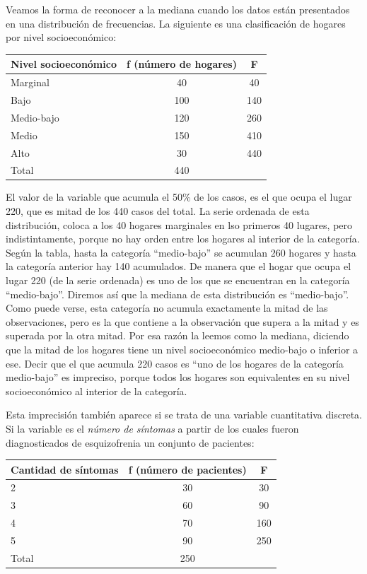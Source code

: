 \documentclass[]{book}
\begin{document}
Veamos la forma de reconocer a la mediana cuando los datos están
presentados en una distribución de frecuencias. La siguiente es una
clasificación de hogares por nivel socioeconómico:

\begin{longtable}[]{@{}lcc@{}}
\toprule
Nivel socioeconómico & f (número de hogares) & F\tabularnewline
\midrule
\endhead
Marginal & 40 & 40\tabularnewline
Bajo & 100 & 140\tabularnewline
Medio-bajo & 120 & 260\tabularnewline
Medio & 150 & 410\tabularnewline
Alto & 30 & 440\tabularnewline
Total & 440 &\tabularnewline
\bottomrule
\end{longtable}

El valor de la variable que acumula el 50\% de los casos, es el que ocupa el lugar 220, que es mitad de los 440 casos del total. La serie ordenada de esta distribución, coloca a los 40 hogares marginales en lso primeros 40 lugares, pero indistintamente, porque no hay orden entre los hogares al interior de la categoría. Según la tabla, hasta la categoría ``medio-bajo'' se acumulan 260 hogares y hasta la categoría anterior hay 140 acumulados. De manera que el hogar que ocupa el lugar 220 (de la serie ordenada) es uno de los que se encuentran en la categoría ``medio-bajo''. Diremos así que la mediana de esta distribución es ``medio-bajo''. Como puede verse, esta categoría no acumula exactamente la mitad de las observaciones, pero es la que contiene a la observación que supera a la mitad y es superada por la otra mitad. Por esa razón la leemos como la mediana, diciendo que la mitad de los hogares tiene un nivel socioeconómico medio-bajo o inferior a ese. Decir que el que acumula 220 casos es ``uno de los hogares de la categoría medio-bajo'' es impreciso, porque todos los hogares son equivalentes en su nivel socioeconómico al interior de la categoría.

Esta imprecisión también aparece si se trata de
una variable cuantitativa discreta. Si la variable es el \emph{número de síntomas} a partir de los cuales fueron diagnosticados de esquizofrenia un conjunto de pacientes:

\begin{longtable}[]{@{}lcc@{}}
\toprule
Cantidad de síntomas & f (número de pacientes) & F\tabularnewline
\midrule
\endhead
2 & 30 & 30\tabularnewline
3 & 60 & 90\tabularnewline
4 & 70 & 160\tabularnewline
5 & 90 & 250\tabularnewline
Total & 250 &\tabularnewline
\bottomrule
\end{longtable}
\end{document}
